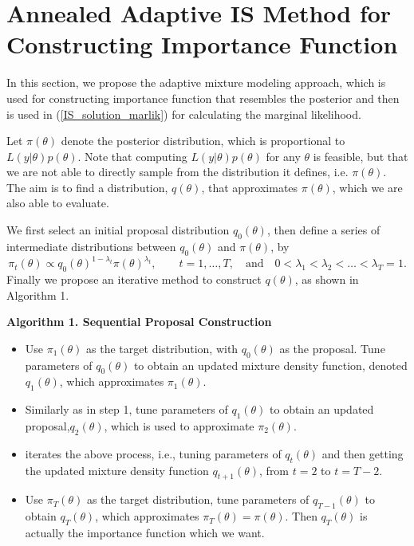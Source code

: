 \section{Annealed Adaptive IS Method for Constructing Importance
  Function} \label{sec:AAIS}
In this section, we propose the adaptive mixture modeling approach,
which is used for constructing importance function that resembles
the posterior and then is used in (\ref{IS_solution_marlik}) for
calculating the marginal likelihood.

Let $\pi(\theta)$ denote the posterior distribution, which is
proportional to $L(y|\theta)p(\theta)$. Note that computing
$L(y|\theta)p(\theta)$ for any $\theta$ is feasible, but that we are
not able to directly sample from the distribution it defines, i.e.
$\pi(\theta)$. The aim is to find a distribution, $q(\theta)$, that
approximates $\pi(\theta)$, which we are also able to evaluate.

We first select an initial proposal distribution $q_0(\theta)$, then
define a series of intermediate distributions between $q_0(\theta)$
and $\pi(\theta)$, by
\begin{equation}
\pi_t(\theta)\propto
q_0(\theta)^{1-\lambda_t}\pi(\theta)^{\lambda_t}, \quad\quad
t=1,\ldots,T, \quad \mbox{and}\quad
0<\lambda_1<\lambda_2<\dots<\lambda_T=1.
\end{equation}
Finally we propose an iterative method to construct $q(\theta)$, as
shown in Algorithm 1.
\begin{center}
\textbf{Algorithm 1. Sequential Proposal Construction}
\end{center}
\begin{itemize}
\item Use $\pi_1(\theta)$ as the target distribution, with $q_0(\theta)$
as the proposal. Tune parameters of $q_0(\theta)$ to obtain an
updated mixture density function, denoted $q_1(\theta)$, which
approximates $\pi_1(\theta)$.
\item Similarly as in step 1, tune parameters of $q_1(\theta)$ to
obtain an updated proposal,$q_2(\theta)$, which is used to
approximate $\pi_2(\theta)$.
\item iterates the above process, i.e., tuning parameters of $q_t(\theta)$ and then getting the updated mixture density function $q_{t+1}(\theta)$, from $t=2$ to $t=T-2$.
\item Use $\pi_T(\theta)$ as the target distribution, tune parameters of
$q_{T-1}(\theta)$ to obtain $q_{T}(\theta)$, which approximates
$\pi_T(\theta)=\pi(\theta)$. Then $q_{T}(\theta)$ is actually the
importance function which we want.
\end{itemize}

